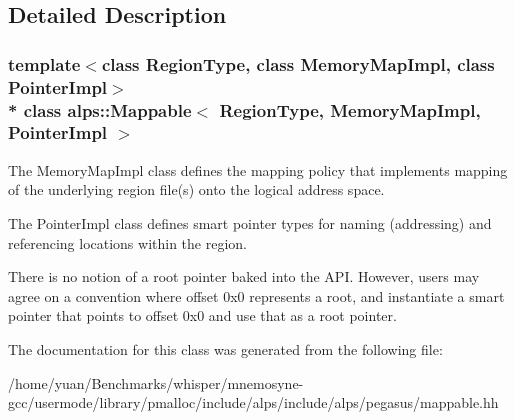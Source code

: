 \subsection{Detailed Description}
\subsubsection*{template$<$class Region\+Type, class Memory\+Map\+Impl, class Pointer\+Impl$>$\\*
class alps\+::\+Mappable$<$ Region\+Type, Memory\+Map\+Impl, Pointer\+Impl $>$}

The Memory\+Map\+Impl class defines the mapping policy that implements mapping of the underlying region file(s) onto the logical address space.

The Pointer\+Impl class defines smart pointer types for naming (addressing) and referencing locations within the region.

There is no notion of a root pointer baked into the A\+PI. However, users may agree on a convention where offset 0x0 represents a root, and instantiate a smart pointer that points to offset 0x0 and use that as a root pointer. 

The documentation for this class was generated from the following file\+:\begin{DoxyCompactItemize}
\item 
/home/yuan/\+Benchmarks/whisper/mnemosyne-\/gcc/usermode/library/pmalloc/include/alps/include/alps/pegasus/mappable.\+hh\end{DoxyCompactItemize}

